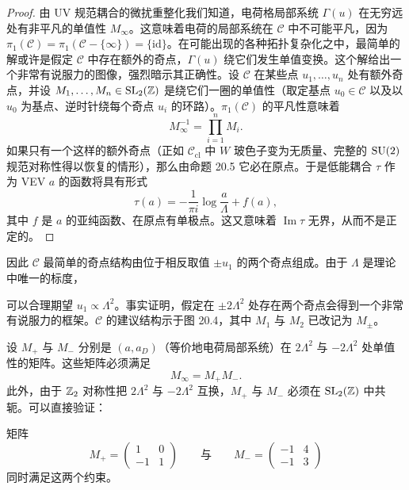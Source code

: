 \begin{proof}
由 UV 规范耦合的微扰重整化我们知道，电荷格局部系统 $\Gamma(u)$ 在无穷远处有非平凡的单值性 $M_\infty$。这意味着电荷的局部系统在 $\mathcal{C}$ 中不可能平凡，因为 $\pi_1(\mathcal{C})=\pi_1(\mathcal{C}-\{\infty\})=\{\mathrm{id}\}$。在可能出现的各种拓扑复杂化之中，最简单的解或许是假定 $\mathcal{C}$ 中存在额外的奇点，$\Gamma(u)$ 绕它们发生单值变换。这个解给出一个非常有说服力的图像，强烈暗示其正确性。设 $\mathcal{C}$ 在某些点 $u_1,\dots,u_n$ 处有额外奇点，并设 $M_1,\dots,M_n\in\operatorname{SL}_2(\mathbb{Z})$ 是绕它们一圈的单值性（取定基点 $u_0\in\mathcal{C}$ 以及以 $u_0$ 为基点、逆时针绕每个奇点 $u_i$ 的环路）。$\pi_1(\mathcal{C})$ 的平凡性意味着
\[
M_\infty^{-1}=\prod_{i=1}^{n}M_i.
\]
如果只有一个这样的额外奇点（正如 $\mathcal{C}_{\mathrm{cl}}$ 中 $W$ 玻色子变为无质量、完整的 $\operatorname{SU}(2)$ 规范对称性得以恢复的情形），那么由命题 20.5 它必在原点。于是低能耦合 $\tau$ 作为 VEV $a$ 的函数将具有形式
\[
\tau(a)=-\frac{1}{\pi i}\log\frac{a}{\Lambda}+f(a),
\]
其中 $f$ 是 $a$ 的亚纯函数、在原点有单极点。这又意味着 $\operatorname{Im}\tau$ 无界，从而不是正定的。
\end{proof}

因此 $\mathcal{C}$ 最简单的奇点结构由位于相反取值 $\pm u_1$ 的两个奇点组成。由于 $\Lambda$ 是理论中唯一的标度，

可以合理期望 $u_1\propto\Lambda^2$。事实证明，假定在 $\pm2\Lambda^2$ 处存在两个奇点会得到一个非常有说服力的框架。$\mathcal{C}$ 的建议结构示于图 20.4，其中 $M_1$ 与 $M_2$ 已改记为 $M_\pm$。


设 $M_+$ 与 $M_-$ 分别是 $(a,a_D)$（等价地电荷局部系统）在 $2\Lambda^2$ 与 $-2\Lambda^2$ 处单值性的矩阵。这些矩阵必须满足
\[
M_\infty=M_+M_-.
\]
此外，由于 $\mathbb{Z}_2$ 对称性把 $2\Lambda^2$ 与 $-2\Lambda^2$ 互换，$M_+$ 与 $M_-$ 必须在 $\operatorname{SL}_2(\mathbb{Z})$ 中共轭。可以直接验证：

\begin{proposition}[20.7]
矩阵
\begin{equation}
M_+=\begin{pmatrix}1&0\\-1&1\end{pmatrix}\qquad\text{与}\qquad M_-=\begin{pmatrix}-1&4\\-1&3\end{pmatrix}
\tag{20.6}
\end{equation}
同时满足这两个约束。
\end{proposition}

